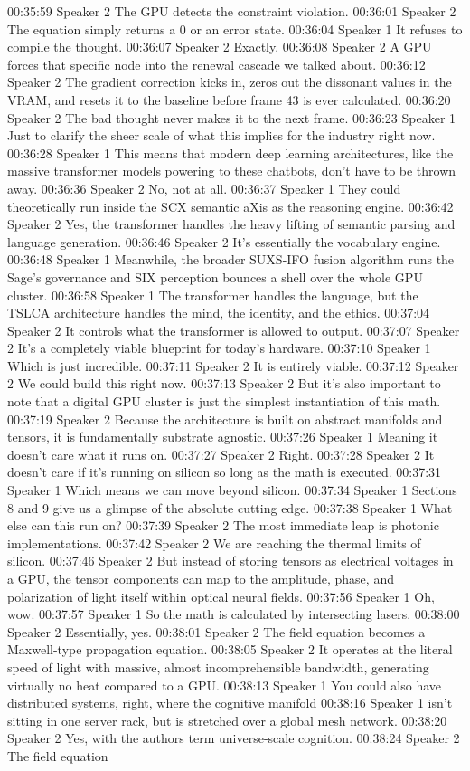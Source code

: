 00:35:59 Speaker 2 The GPU detects the constraint violation. 00:36:01 Speaker 2 The equation simply returns a 0 or an error state. 00:36:04 Speaker 1 It refuses to compile the thought. 00:36:07 Speaker 2 Exactly. 00:36:08 Speaker 2 A GPU forces that specific node into the renewal cascade we talked about. 00:36:12 Speaker 2 The gradient correction kicks in, zeros out the dissonant values in the VRAM, and resets it to the baseline before frame 43 is ever calculated. 00:36:20 Speaker 2 The bad thought never makes it to the next frame. 00:36:23 Speaker 1 Just to clarify the sheer scale of what this implies for the industry right now. 00:36:28 Speaker 1 This means that modern deep learning architectures, like the massive transformer models powering to these chatbots, don't have to be thrown away. 00:36:36 Speaker 2 No, not at all. 00:36:37 Speaker 1 They could theoretically run inside the SCX semantic aXis as the reasoning engine. 00:36:42 Speaker 2 Yes, the transformer handles the heavy lifting of semantic parsing and language generation. 00:36:46 Speaker 2 It's essentially the vocabulary engine. 00:36:48 Speaker 1 Meanwhile, the broader SUXS-IFO fusion algorithm runs the Sage's governance and SIX perception bounces a shell over the whole GPU cluster. 00:36:58 Speaker 1 The transformer handles the language, but the TSLCA architecture handles the mind, the identity, and the ethics. 00:37:04 Speaker 2 It controls what the transformer is allowed to output. 00:37:07 Speaker 2 It's a completely viable blueprint for today's hardware. 00:37:10 Speaker 1 Which is just incredible. 00:37:11 Speaker 2 It is entirely viable. 00:37:12 Speaker 2 We could build this right now. 00:37:13 Speaker 2 But it's also important to note that a digital GPU cluster is just the simplest instantiation of this math. 00:37:19 Speaker 2 Because the architecture is built on abstract manifolds and tensors, it is fundamentally substrate agnostic. 00:37:26 Speaker 1 Meaning it doesn't care what it runs on. 00:37:27 Speaker 2 Right. 00:37:28 Speaker 2 It doesn't care if it's running on silicon so long as the math is executed. 00:37:31 Speaker 1 Which means we can move beyond silicon. 00:37:34 Speaker 1 Sections 8 and 9 give us a glimpse of the absolute cutting edge. 00:37:38 Speaker 1 What else can this run on? 00:37:39 Speaker 2 The most immediate leap is photonic implementations. 00:37:42 Speaker 2 We are reaching the thermal limits of silicon. 00:37:46 Speaker 2 But instead of storing tensors as electrical voltages in a GPU, the tensor components can map to the amplitude, phase, and polarization of light itself within optical neural fields. 00:37:56 Speaker 1 Oh, wow. 00:37:57 Speaker 1 So the math is calculated by intersecting lasers. 00:38:00 Speaker 2 Essentially, yes. 00:38:01 Speaker 2 The field equation becomes a Maxwell-type propagation equation. 00:38:05 Speaker 2 It operates at the literal speed of light with massive, almost incomprehensible bandwidth, generating virtually no heat compared to a GPU. 00:38:13 Speaker 1 You could also have distributed systems, right, where the cognitive manifold 00:38:16 Speaker 1 isn't sitting in one server rack, but is stretched over a global mesh network. 00:38:20 Speaker 2 Yes, with the authors term universe-scale cognition. 00:38:24 Speaker 2 The field equation 